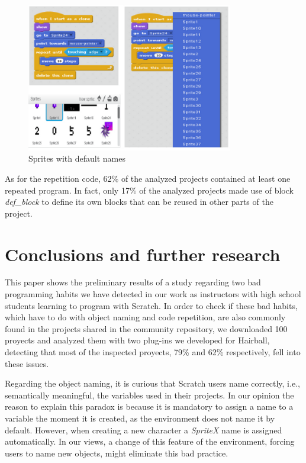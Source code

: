 \documentclass[conference]{format/IEEEtran}
\begin{document}
\begin{figure}
  \centering
    \includegraphics[width=9cm]{img/SpriteNaming.png}
  \caption{Sprites with default names}
  \label{fig:SpriteNaming}
\end{figure}

As for the repetition code, 62\% of the analyzed projects contained at least one repeated program. In fact, only 17\% of the analyzed projects made use of block \textit{def\_block} to define its own blocks that can be reused in other parts of the project. 

\section{Conclusions and further research}
\label{sec:conclusions}


This paper shows the preliminary results of a study regarding two bad programming habits we have detected in our work as instructors with high school students learning to program with Scratch. In order to check if these bad habits, which have to do with object naming and code repetition, are also commonly found in the projects shared in the community repository, we downloaded 100 proyects and analyzed them with two plug-ins we developed for Hairball, detecting that most of the inspected proyects, 79\% and 62\%  respectively, fell into these issues.

Regarding the object naming, it is curious that Scratch users name correctly, i.e., semantically meaningful, the variables used in their projects. In our opinion the reason to explain this paradox is because it is mandatory to assign a name to a variable the moment it is created, as the environment does not name it by default. However, when creating a new character a  \textit{SpriteX} name is assigned automatically. In our views, a change of this feature of the environment, forcing users to name new objects, might eliminate this bad practice.
\end{document}
